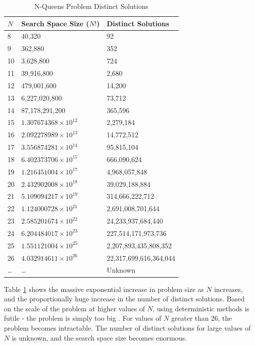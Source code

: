 \documentclass[conference]{IEEEtran}
\begin{document}
\begin{table}[h!]
\centering
\caption{N-Queens Problem Distinct Solutions}
\begin{tabular}{|l|l|l|} \hline
$N$  & Search Space Size ($N!$)      & Distinct Solutions     \\ \hline
8  & 40,320                     & 92                     \\
9  & 362,880                    & 352                    \\
10 & 3,628,800                  & 724                    \\
11 & 39,916,800                 & 2,680                  \\
12 & 479,001,600                & 14,200                 \\
13 & 6,227,020,800              & 73,712                 \\
14 & 87,178,291,200             & 365,596                \\
15 & $1.307674368\times10^{12}$ & 2,279,184              \\
16 & $2.092278989\times10^{13}$ & 14,772,512             \\
17 & $3.556874281\times10^{14}$ & 95,815,104             \\
18 & $6.402373706\times10^{15}$ & 666,090,624            \\
19 & $1.216451004\times10^{17}$ & 4,968,057,848          \\
20 & $2.432902008\times10^{18}$ & 39,029,188,884         \\
21 & $5.109094217\times10^{19}$ & 314,666,222,712        \\
22 & $1.124000728\times10^{21}$ & 2,691,008,701,644      \\
23 & $2.585201674\times10^{22}$ & 24,233,937,684,440     \\
24 & $6.204484017\times10^{23}$ & 227,514,171,973,736    \\
25 & $1.551121004\times10^{25}$ & 2,207,893,435,808,352  \\
26 & $4.032914611\times10^{26}$ & 22,317,699,616,364,044 \\
\dots & \dots & Unknown				\\
\hline\end{tabular}
\label{table:probgrowth}
\end{table}

Table \ref{table:probgrowth} shows the massive exponential increase in problem size as $N$ increases, and the proportionally huge increase in the number of distinct solutions. Based on the scale of the problem at higher values of $N$, using deterministic methods is futile - the problem is simply too big \cite{cit:20}. For values of $N$ greater than 26, the problem becomes intractable. The number of distinct solutions for large values of $N$ is unknown, and the search space size becomes enormous. 
\end{document}
